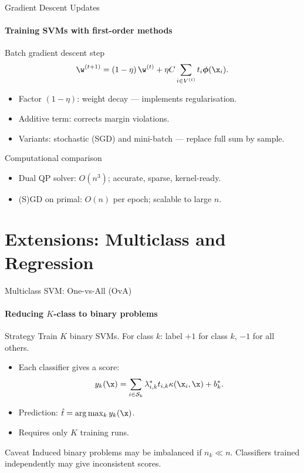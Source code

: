 \begin{frame}{Gradient Descent Updates}
  \framesubtitle{Training SVMs with first-order methods}
  \begin{block}{Batch gradient descent step}
    \[
      \w^{(t+1)} = (1-\eta)\,\w^{(t)} + \eta C \sum_{i\in V^{(t)}} t_i\boldsymbol{\phi}(\x_i).
    \]
  \end{block}
  \begin{itemize}
    \item Factor $(1-\eta)$: \alert{weight decay} — implements regularisation.
    \item Additive term: corrects \alert{margin violations}.
    \item Variants: stochastic (SGD) and mini-batch — replace full sum by sample.
  \end{itemize}
  \begin{block}{Computational comparison}
    \begin{itemize}
      \item Dual QP solver: $O(n^3)$; accurate, sparse, kernel-ready.
      \item (S)GD on primal: $O(n)$ per epoch; scalable to large $n$.
    \end{itemize}
  \end{block}
\end{frame}

\section{Extensions: Multiclass and Regression}

\begin{frame}{Multiclass SVM: One-vs-All (OvA)}
  \framesubtitle{Reducing $K$-class to binary problems}
  \begin{block}{Strategy}
    Train $K$ binary SVMs. For class $k$: label $+1$ for class $k$, $-1$ for all others.
  \end{block}
  \begin{itemize}
    \item Each classifier gives a score:
          \[
            y_k(\x) = \sum_{i\in\mathcal{S}_k} \lambda_{i,k}^* t_{i,k} \kappa(\x_i,\x) + b_k^*.
          \]
    \item Prediction: $\hat{t} = \arg\max_{k} y_k(\x)$.
    \item Requires only $K$ training runs.
  \end{itemize}
  \begin{alertblock}{Caveat}
    Induced binary problems may be \alert{imbalanced} if $n_k \ll n$.
    Classifiers trained independently may give inconsistent scores.
  \end{alertblock}
\end{frame}

